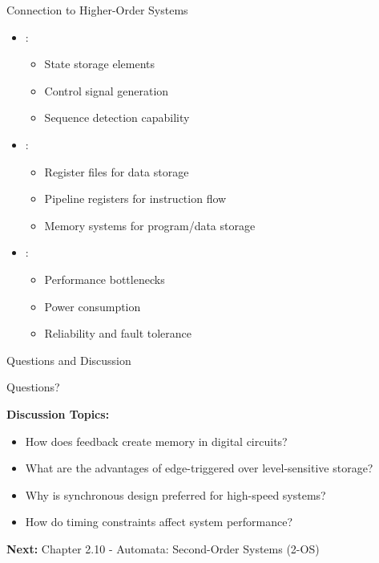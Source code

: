 \begin{frame}{Connection to Higher-Order Systems}
\begin{itemize}
\item {}:
\begin{itemize}
\item State storage elements
\item Control signal generation
\item Sequence detection capability
\end{itemize}
\vspace{0.3cm}
\item {}:
\begin{itemize}
\item Register files for data storage
\item Pipeline registers for instruction flow
\item Memory systems for program/data storage
\end{itemize}
\vspace{0.3cm}
\item {}:
\begin{itemize}
\item Performance bottlenecks
\item Power consumption
\item Reliability and fault tolerance
\end{itemize}
\end{itemize}
\end{frame}

\begin{frame}{Questions and Discussion}
\begin{center}
\Large
Questions?

\vspace{1cm}

\normalsize
\textbf{Discussion Topics:}
\begin{itemize}
\item How does feedback create memory in digital circuits?
\item What are the advantages of edge-triggered over level-sensitive storage?
\item Why is synchronous design preferred for high-speed systems?
\item How do timing constraints affect system performance?
\end{itemize}

\vspace{0.5cm}
\textbf{Next:} Chapter 2.10 - Automata: Second-Order Systems (2-OS)
\end{center}
\end{frame}
